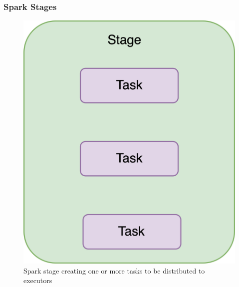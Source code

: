\begin{frame}
    \frametitle{Spark Stages}
    \begin{figure}
        \includegraphics[width=\textwidth,height=.7\textheight,keepaspectratio]{./Figures/chapter-04/Spark_Stage}
        \caption{Spark stage creating one or more tasks to be distributed to executors}\label{fig:spark_stage}
    \end{figure}
\end{frame}

